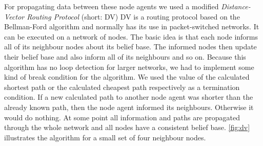For propagating data between these node agents we used a modified \emph{Distance-Vector Routing Protocol} \cite{dvrp} (short: DV)
DV is a routing protocol based on the Bellman-Ford algorithm and normally has its use in packet-switched networks.
It can be executed on a network of nodes.
The basic idea is that each node informs all of its neighbour nodes about its belief base.
The informed nodes then update their belief base and also inform all of its neighbours and so on.
Because this algorithm has no loop detection for larger networks, we had to implement some kind of break condition for the algorithm.
We used the value of the calculated shortest path or the calculated cheapest path respectively as a termination condition.
If a new calculated path to another node agent was shorter than the already known path, then the node agent informed its neighbours.
Otherwise it would do nothing.
At some point all information and paths are propagated through the whole network and all nodes have a consistent belief base.
\autoref{fig:dv} illustrates the algorithm for a small set of four neighbour nodes.

